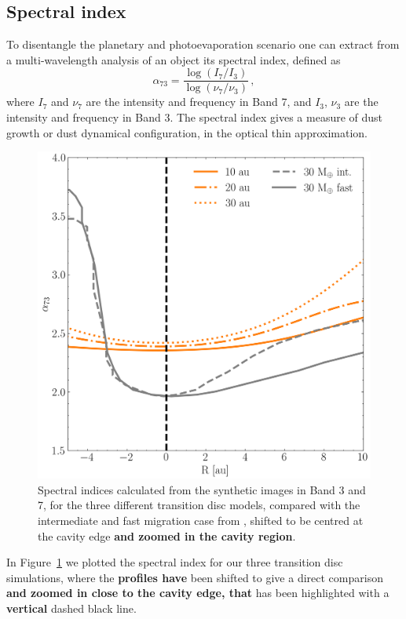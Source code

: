 \documentclass[fleqn,usenatbib]{mnras}
\begin{document}
    \subsection{Spectral index}
    To disentangle the planetary and photoevaporation scenario one can extract from a multi-wavelength analysis of an object its spectral index, defined as
    \begin{equation}
        \alpha_{73} = \frac{\log{(I_7/I_3)}}{\log{(\nu_7/\nu_3)}}\,,
    \end{equation}
    where $I_7$ and $\nu_7$ are the intensity and frequency in Band 7, and $I_3$, $\nu_3$ are the intensity and frequency in Band 3.
    The spectral index gives a measure of dust growth or dust dynamical configuration, in the optical thin approximation.
    \begin{figure}
        \centering
        \includegraphics[width=\columnwidth]{Fig7}
        \caption{Spectral indices calculated from the synthetic images in Band 3 and 7, for the three different transition disc models, compared with the intermediate and fast migration case from \citet{Nazari_2019}, shifted to be centred at the cavity edge \textbf{and zoomed in the cavity region}.}
        \label{fig:spectral_index}
    \end{figure}
    In Figure~\ref{fig:spectral_index} we plotted the spectral index for our three transition disc simulations, where the \textbf{profiles have} been shifted to give a direct comparison \textbf{and zoomed in close to the cavity edge, that} has been highlighted with a \textbf{vertical} dashed black line.
\end{document}
